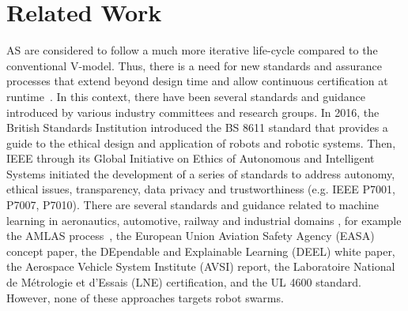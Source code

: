 \documentclass[runningheads]{llncs}
\begin{document}
\section{Related Work}\label{relatedwork}%
AS are considered to follow a much more iterative life-cycle compared to the conventional V-model. 
Thus, there is a need for new standards and assurance processes that extend beyond design time and allow continuous certification at runtime~\cite{Rushby2008}. 
In this context, there have been several standards and guidance introduced by various industry committees and research groups. In 2016, the British Standards Institution introduced the BS 8611 standard that provides a guide to the ethical design and application of robots and robotic systems. %
Then, IEEE through its Global Initiative on Ethics of Autonomous and Intelligent Systems initiated the development of a series of standards to address autonomy, ethical issues, transparency, data privacy and trustworthiness (e.g. IEEE P7001, P7007, P7010).  
There are several standards and guidance related to machine learning in aeronautics, automotive, railway and industrial domains \cite{Kaakai2022}, for example the AMLAS process~\cite{Hawkins2021}, the European Union Aviation Safety Agency (EASA) concept paper, the DEpendable and Explainable Learning (DEEL) white paper, the Aerospace Vehicle System Institute (AVSI) report, the Laboratoire National de Métrologie et d'Essais (LNE) certification, and the UL 4600 standard. However, none of these approaches targets robot swarms. %
\end{document}
